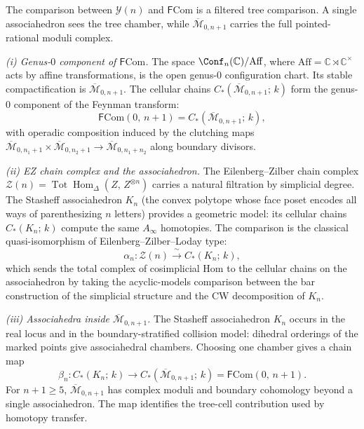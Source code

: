 \begin{remark}
\label{rem:ez-fcom-precise-truncation}
The comparison between $\mathcal{Y}(n)$ and
$\mathsf{F}\mathrm{Com}$ is a filtered tree comparison.  A single
associahedron sees the tree chamber, while
$\overline{\mathcal M}_{0,n+1}$ carries the full pointed-rational
moduli complex.

\smallskip\noindent\emph{(i) Genus-$0$ component of
$\mathsf{F}\mathrm{Com}$.}
The space $\Conf_n(\mathbb{C})/\mathrm{Aff}$, where
$\mathrm{Aff} = \mathbb{C} \rtimes \mathbb{C}^\times$ acts by
affine transformations, is the open genus-$0$ configuration chart.
Its stable compactification is $\overline{\mathcal{M}}_{0,n+1}$.
The cellular chains
$C_*(\overline{\mathcal{M}}_{0,n+1};\, k)$ form the genus-$0$
component of the Feynman transform:
\[
\mathsf{F}\mathrm{Com}(0,\, n{+}1)
= C_*(\overline{\mathcal{M}}_{0,n+1};\, k),
\]
with operadic composition induced by the clutching maps
$\overline{\mathcal{M}}_{0,n_1+1} \times
\overline{\mathcal{M}}_{0,n_2+1}
\to \overline{\mathcal{M}}_{0,n_1+n_2}$
along boundary divisors.

\smallskip\noindent\emph{(ii) EZ chain complex and the
associahedron.}
The Eilenberg--Zilber chain complex
$\mathcal{Z}(n)
= \operatorname{Tot}\operatorname{Hom}_\Delta(Z,\, Z^{\otimes n})$
carries a natural filtration by simplicial degree. The Stasheff
associahedron $K_n$ (the convex polytope whose face poset encodes
all ways of parenthesizing $n$ letters) provides a geometric
model: its cellular chains $C_*(K_n;\, k)$ compute the same
$A_\infty$ homotopies. The comparison is the classical
quasi-isomorphism of Eilenberg--Zilber--Loday type:
\[
\alpha_n \colon \mathcal{Z}(n)
 \xrightarrow{\;\sim\;} C_*(K_n;\, k),
\]
which sends the total complex of cosimplicial Hom to the cellular
chains on the associahedron by taking the acyclic-models
comparison between the bar construction of the simplicial
structure and the CW decomposition of $K_n$.

\smallskip\noindent\emph{(iii) Associahedra inside
$\overline{\mathcal{M}}_{0,n+1}$.}
The Stasheff associahedron $K_n$ occurs in the real locus and in the
boundary-stratified collision model: dihedral orderings of the marked
points give associahedral chambers.  Choosing one chamber gives a
chain map
\[
\beta_n \colon C_*(K_n;\, k)
 \longrightarrow C_*(\overline{\mathcal{M}}_{0,n+1};\, k)
 = \mathsf{F}\mathrm{Com}(0,\, n{+}1).
\]
For $n+1\geq 5$, $\overline{\mathcal{M}}_{0,n+1}$ has complex moduli
and boundary cohomology beyond a single associahedron.  The map
identifies the tree-cell contribution used by homotopy transfer.


\end{remark}
